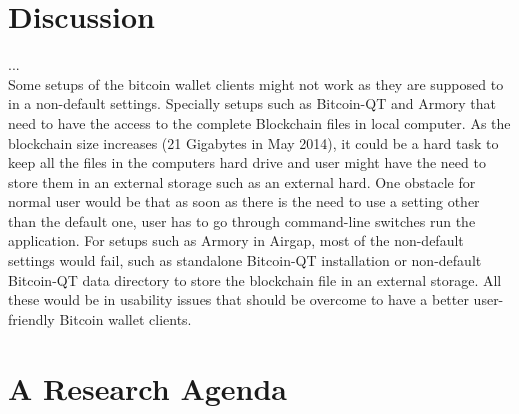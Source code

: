 
\section{Discussion}
... \\
Some setups of the bitcoin wallet clients might not work as they are supposed to in a non-default settings. Specially setups such as Bitcoin-QT and Armory that need to have the access to the complete Blockchain files in local computer. As the blockchain size increases (21 Gigabytes in May 2014), it could be a hard task to keep all the files in the computers hard drive and user might have the need to store them in an external storage such as an external hard. One obstacle for normal user would be that as soon as there is the need to use a setting other than the default one, user has to go through command-line switches run the application. For setups such as Armory in Airgap, most of the non-default settings would fail, such as standalone Bitcoin-QT installation or non-default Bitcoin-QT data directory to store the blockchain file in an external storage. All these would be in usability issues that should be overcome to have a better user-friendly Bitcoin wallet clients. 


\section{A Research Agenda}



